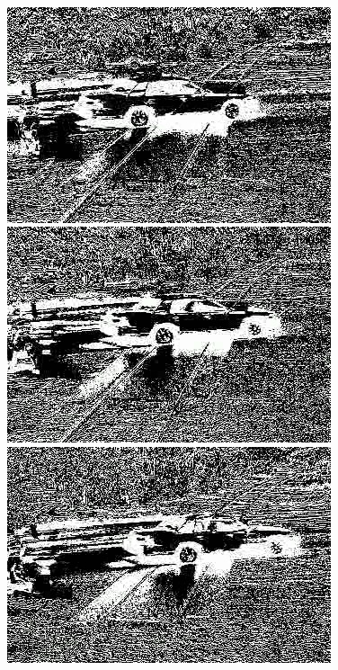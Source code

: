\documentclass[a4paper]{ctexart}
\begin{document}
\begin{enumerate}[label=\arabic*、]
\begin{figure}[htbp]
\begin{minipage}[t]{0.2\textwidth}
		\end{minipage}\\
		\begin{minipage}[t]{0.2\textwidth}
			\centering
			\includegraphics[width=\textwidth]{figure/frames/avg29400.jpg}
		\end{minipage}
		\begin{minipage}[t]{0.2\textwidth}
			\centering
			\includegraphics[width=\textwidth]{figure/frames/avg29405.jpg}
		\end{minipage}
		\begin{minipage}[t]{0.2\textwidth}
			\centering
			\includegraphics[width=\textwidth]{figure/frames/avg29410.jpg}

\end{minipage}
\end{figure}
\end{enumerate}
\end{document}
